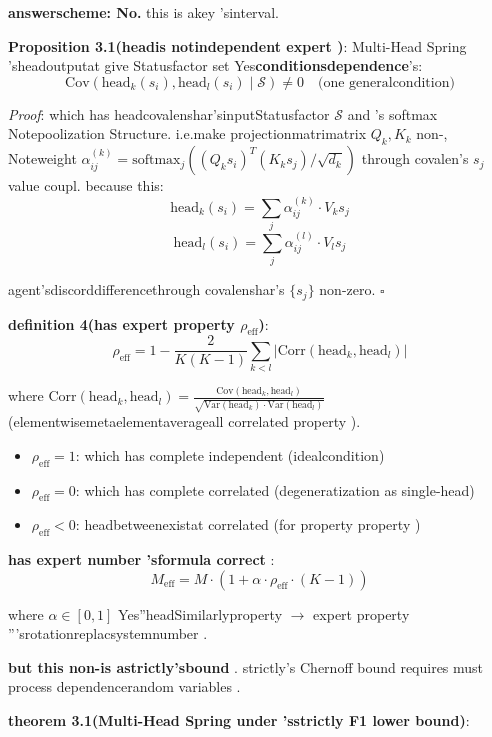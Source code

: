 \documentclass[
  12pt,
]{article}
\providecommand{\tightlist}{%
  \setlength{\itemsep}{0pt}\setlength{\parskip}{0pt}}
\begin{document}
\textbf{answerscheme: No. } this is akey 'sinterval. 

\textbf{Proposition 3.1(headis notindependent expert )}: Multi-Head Spring
'sheadoutputat give Statusfactor set Yes\textbf{conditionsdependence}'s: 
\[\text{Cov}(\text{head}_k(s_i), \text{head}_l(s_i) \mid \mathcal{S}) \neq 0 \quad \text{(one generalcondition)}\]

\emph{Proof}: which has headcovalenshar'sinputStatusfactor  \(\mathcal{S}\) and 's
softmax Notepoolization Structure. i.e.make projectionmatrimatrix  \(Q_k, K_k\) non-, Noteweight
\(\alpha_{ij}^{(k)} = \text{softmax}_j((Q_k s_i)^T (K_k s_j) / \sqrt{d_k})\)
through covalen's \(s_j\) value coupl. because this: 
\[\text{head}_k(s_i) = \sum_j \alpha_{ij}^{(k)} \cdot V_k s_j\]
\[\text{head}_l(s_i) = \sum_j \alpha_{ij}^{(l)} \cdot V_l s_j\]

agent'sdiscorddifferencethrough covalenshar's \(\{s_j\}\) non-zero. \(\square\)

\textbf{definition  4(has expert property  \(\rho_{\text{eff}}\))}: 
\[\boxed{\rho_{\text{eff}} = 1 - \frac{2}{K(K-1)} \sum_{k < l} |\text{Corr}(\text{head}_k, \text{head}_l)|}\]

where
\(\text{Corr}(\text{head}_k, \text{head}_l) = \frac{\text{Cov}(\text{head}_k, \text{head}_l)}{\sqrt{\text{Var}(\text{head}_k) \cdot \text{Var}(\text{head}_l)}}\)(elementwisemetaelementaverageall correlated property ). 

\begin{itemize}
\tightlist
\item
  \(\rho_{\text{eff}} = 1\): which has complete independent (idealcondition)
\item
  \(\rho_{\text{eff}} = 0\): which has complete correlated (degeneratization as single-head)
\item
  \(\rho_{\text{eff}} < 0\): headbetweenexistat correlated (for property property )
\end{itemize}

\textbf{has expert number 'sformula correct }: 
\[M_{\text{eff}} = M \cdot (1 + \alpha \cdot \rho_{\text{eff}} \cdot (K - 1))\]

where \(\alpha \in [0, 1]\) Yes''headSimilarlyproperty  \(\to\) expert property '''srotationreplacsystemnumber . 

\textbf{but this non-is astrictly'sbound }. strictly's Chernoff bound
requires must process dependencerandom variables . 

\textbf{theorem  3.1(Multi-Head Spring under 'sstrictly F1 lower bound)}: 
\end{document}
